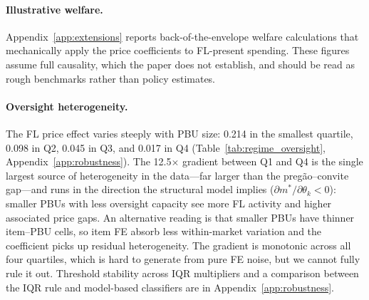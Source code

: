\paragraph{Illustrative welfare.}
Appendix~\ref{app:extensions} reports back-of-the-envelope welfare
calculations that mechanically apply the price coefficients to
FL-present spending. These figures assume full causality, which the
paper does not establish, and should be read as rough benchmarks
rather than policy estimates.


\paragraph{Oversight heterogeneity.}
The FL price effect varies steeply with PBU size: 0.214 in the
smallest quartile, 0.098 in Q2, 0.045 in Q3, and 0.017 in Q4
(Table~\ref{tab:regime_oversight}, Appendix~\ref{app:robustness}).
The 12.5$\times$ gradient between Q1 and Q4 is the single largest
source of heterogeneity in the data---far larger than the
preg\~ao--convite gap---and runs in the direction the structural
model implies ($\partial m^*/\partial \theta_k < 0$): smaller PBUs
with less oversight capacity see more FL activity and higher
associated price gaps. An alternative reading is that smaller PBUs
have thinner item--PBU cells, so item FE absorb less within-market
variation and the coefficient picks up residual heterogeneity. The
gradient is monotonic across all four quartiles, which is hard to
generate from pure FE noise, but we cannot fully rule it out.
Threshold stability across IQR multipliers and a comparison between
the IQR rule and model-based classifiers are in
Appendix~\ref{app:robustness}.
